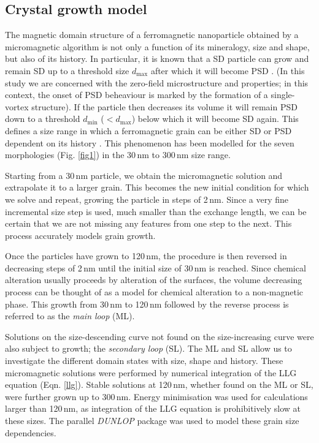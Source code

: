 \documentclass[review,authoryear]{elsarticle}
\newcommand{\dmax}{d_\text{max}}
\newcommand{\dmin}{d_\text{min}}
\newcommand{\nm}{\,\text{nm}}
\begin{document}
\subsection{Crystal growth model}
The magnetic domain structure of a ferromagnetic nanoparticle obtained by a micromagnetic algorithm is not only a function of its mineralogy, size and shape, but also of its history. In particular, it is known that a SD particle can grow and remain SD up to a threshold size $\dmax$ after which it will become PSD \citep{Enkin1994}. (In this study we are concerned with the zero-field microstructure and properties; in this context, the onset of PSD beheaviour is marked by the formation of a single-vortex structure). If the particle then decreases its volume it will remain PSD down to a threshold $\dmin$ ($< \dmax$) below which it will become SD again. This defines a size range in which a ferromagnetic grain can be either SD or PSD dependent on its history \citep{Muxworthy2006}. This phenomenon has been modelled for the seven morphologies (Fig. \ref{fig1}) in the 30$\nm$ to 300$\nm$ size range.\par

Starting from a 30$\nm$ particle, we obtain the micromagnetic solution and extrapolate it to a larger grain. This becomes the new initial condition for which we solve and repeat, growing the particle in steps of 2$\nm$. Since a very fine incremental size step is used, much smaller than the exchange length, we can be certain that we are not missing any features from one step to the next. This process accurately models grain growth.\par

Once the particles have grown to 120$\nm$, the procedure is then reversed in decreasing steps of 2$\nm$ until the initial size of 30$\nm$ is reached. Since chemical alteration usually proceeds by alteration of the surfaces, the volume decreasing process can be thought of as a model for chemical alteration to a non-magnetic phase. This growth from 30$\nm$ to 120$\nm$ followed by the reverse process is referred to as the \textit{main loop} (ML).\par

Solutions on the size-descending curve not found on the size-increasing curve were also subject to growth; the \textit{secondary loop} (SL). The ML and SL allow us to investigate the different domain states with size, shape and history. These micromagnetic solutions were performed by numerical integration of the LLG equation (Eqn. \ref{llg}). Stable solutions at 120$\nm$, whether found on the ML or SL, were further grown up to 300$\nm$. Energy minimisation was used for calculations larger than 120$\,$nm, as integration of the LLG equation is prohibitively slow at these sizes. The parallel \textit{DUNLOP} package \citep{Nagy2016} was used to model these grain size dependencies.\par
\end{document}
